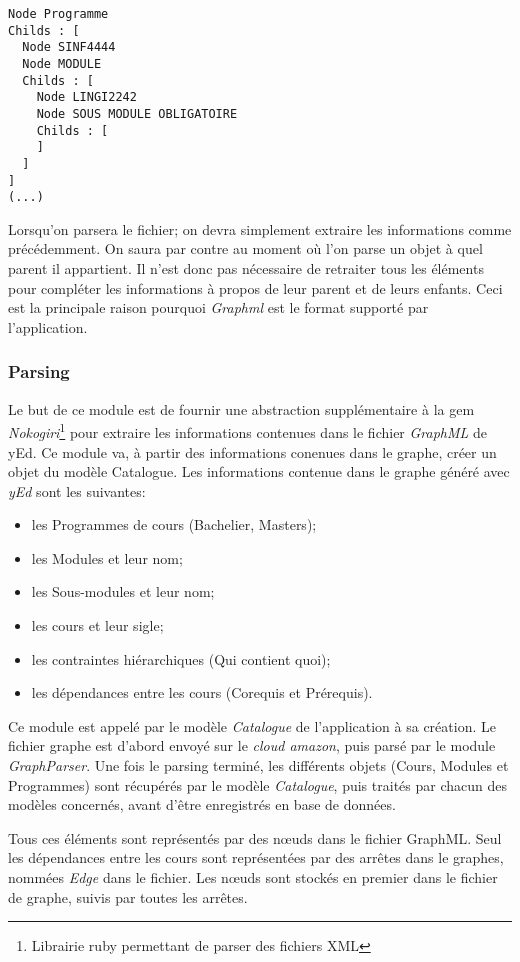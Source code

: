\begin{lstlisting}
Node Programme
Childs : [
  Node SINF4444
  Node MODULE
  Childs : [
    Node LINGI2242
    Node SOUS MODULE OBLIGATOIRE
    Childs : [
    ]
  ]
]
(...)
\end{lstlisting}

Lorsqu'on parsera le fichier; on devra simplement extraire les informations comme précédemment. On saura par contre au moment où l'on parse un objet à quel parent il appartient.  Il n'est donc pas nécessaire de retraiter tous les éléments pour compléter les informations à propos de leur parent et de leurs enfants. Ceci est la principale raison pourquoi \textit{Graphml} est le format supporté par l'application.


\subsubsection{Parsing}
\label{graph_parsing}
Le but de ce module est de fournir une abstraction supplémentaire à la gem \textit{Nokogiri}\footnote{Librairie ruby permettant de parser des fichiers XML} pour extraire les informations contenues dans le fichier \textit{GraphML} de yEd. Ce module va, à partir des informations conenues dans le graphe, créer un objet du modèle Catalogue. Les informations contenue dans le graphe généré avec \textit{yEd} sont les suivantes:
\begin{itemize}
\item les Programmes de cours (Bachelier, Masters);
\item les Modules et leur nom;
\item les Sous-modules et leur nom;
\item les cours et leur sigle;
\item les contraintes hiérarchiques (Qui contient quoi);
\item les dépendances entre les cours (Corequis et Prérequis).
\end{itemize}


Ce module est appelé par le modèle \textit{Catalogue} de l'application à sa création. Le fichier graphe est d'abord envoyé sur le  \textit{cloud amazon}, puis parsé par le module \textit{GraphParser}. Une fois le parsing terminé, les différents objets (Cours, Modules et Programmes) sont récupérés par le modèle \textit{Catalogue}, puis traités par chacun des modèles concernés, avant d'être enregistrés en base de données. 

Tous ces éléments sont représentés par des nœuds dans le fichier GraphML. Seul les dépendances entre les cours sont représentées par des arrêtes dans le graphes, nommées \textit{Edge} dans le fichier. Les nœuds sont stockés en premier dans le fichier de graphe, suivis par toutes les arrêtes. 

